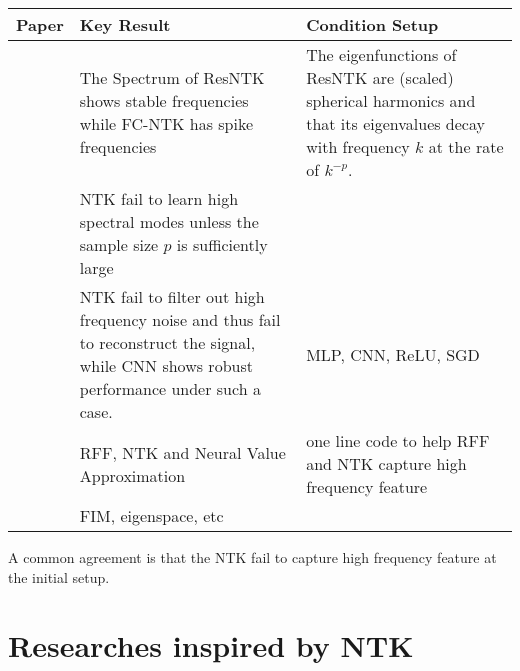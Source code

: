 \documentclass{article}
\begin{document}
\begin{table}[H]
\centering
\begin{tabular}{|p{}|p{}|p{}|}
\hline
Paper & Key Result & Condition Setup \\
\hline
\cite{Belfer}        & The Spectrum of ResNTK shows stable frequencies while FC-NTK has spike frequencies & The eigenfunctions of ResNTK are (scaled) spherical harmonics and that its eigenvalues decay with frequency $k$ at the rate of $k^{-p}$. \\
\hline
\cite{Bordelon}            & NTK fail to learn high spectral modes unless the sample size $p$ is sufficiently large  &\\
\hline
\cite{Karp}        & NTK fail to filter out high frequency noise and thus fail to reconstruct the signal, while CNN shows robust performance under such a case. & MLP, CNN, ReLU, SGD \\
\hline
\cite{Tancik2020,Yang2022}        & RFF, NTK and Neural Value Approximation & one line code to help RFF and NTK capture high frequency feature \\
\hline
\cite{Karakida2020}        & FIM, eigenspace, etc &  \\
\hline
\end{tabular}
\end{table}

A common agreement is that the NTK fail to capture high frequency feature at the initial setup.

\section{Researches inspired by NTK}
\end{document}
